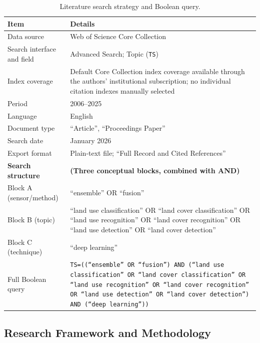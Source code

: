 \documentclass[]{interact}
\theoremstyle{plain}%
\theoremstyle{definition}
\theoremstyle{remark}
\begin{document}
\begin{table}[htb!]
	\centering
	\setlength{\belowcaptionskip}{5pt}
		\caption{Literature search strategy and Boolean query.}
		\label{tab:search_strategy}
		\small 
		\setlength{\tabcolsep}{3pt}
		\renewcommand{\arraystretch}{1.4}
		\begin{tabular}{@{} p{4.1cm} p{9.7cm} @{}} 
		\toprule
		\textbf{Item} & \textbf{Details} \\
		\midrule
		Data source & Web of Science Core Collection \\
		Search interface and field & Advanced Search; Topic (\texttt{TS}) \\
		Index coverage & Default Core Collection index coverage available through the authors' institutional subscription; no individual citation indexes manually selected \\
		Period & 2006--2025 \\
		Language & English \\
		Document type & ``Article'', ``Proceedings Paper'' \\
		Search date & January 2026 \\
		Export format & Plain-text file; ``Full Record and Cited References'' \\
		\midrule
		\textbf{Search structure} & \textbf{(Three conceptual blocks, combined with AND)} \\
		Block A (sensor/method) & ``ensemble'' OR ``fusion'' \\
		Block B (topic) & ``land use classification'' OR ``land cover classification'' OR ``land use recognition'' OR ``land cover recognition'' OR ``land use detection'' OR ``land cover detection'' \\
		Block C (technique) & ``deep learning'' \\
		\midrule
			Full Boolean query & \parbox{9.7cm}{\texttt{TS=((``ensemble'' OR ``fusion'') AND (``land use classification'' OR ``land cover classification'' OR ``land use recognition'' OR ``land cover recognition'' OR ``land use detection'' OR ``land cover detection'') AND (``deep learning''))}} \\
		\bottomrule
	\end{tabular}
\end{table}


\subsection{Research Framework and Methodology}
\label{sec:fusion_coding}
\label{sec:methodology}
\end{document}

